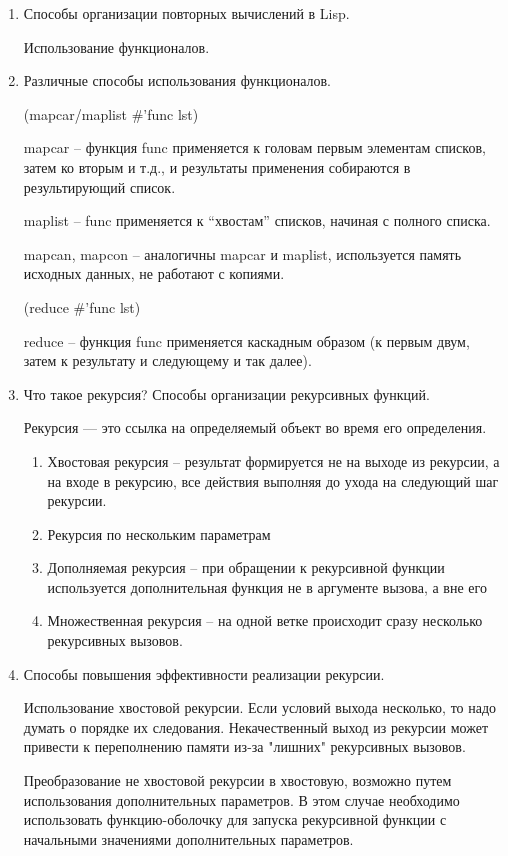 \documentclass[a4paper,14pt]{extreport} %
\begin{document}
\begin{enumerate}
\item Способы организации повторных вычислений в Lisp. 

Использование функционалов. 

\item Различные способы использования функционалов. 

(mapcar/maplist $\#$'func lst)

mapcar -- функция func применяется к головам первым элементам списков, затем ко вторым и т.д., и результаты применения собираются в результирующий список.

maplist -- func применяется к “хвостам” списков, начиная с полного списка.

mapcan, mapcon -- аналогичны mapcar и maplist, используется память исходных данных, не работают с копиями.

(reduce $\#$’func lst)

reduce -- функция func применяется каскадным образом (к первым двум, затем к результату и следующему и так далее).

\item Что такое рекурсия? Способы организации рекурсивных функций. 

Рекурсия — это ссылка на определяемый объект во время его определения. 

\begin{enumerate}
\item Хвостовая рекурсия -- результат формируется не на выходе из рекурсии, а на входе в рекурсию, все действия выполняя до ухода на следующий шаг рекурсии. 
\item Рекурсия по нескольким параметрам
\item Дополняемая рекурсия -- при обращении к рекурсивной функции используется дополнительная функция не в аргументе вызова, а вне его
\item Множественная рекурсия -- на одной ветке происходит сразу несколько рекурсивных вызовов.
\end{enumerate}

\item Способы повышения эффективности реализации рекурсии. 

Использование хвостовой рекурсии. Если условий выхода несколько, то надо думать о порядке их следования. Некачественный выход из рекурсии может привести к переполнению памяти из-за "лишних" рекурсивных вызовов. 

Преобразование не хвостовой рекурсии в хвостовую, возможно путем использования дополнительных параметров. В этом случае необходимо использовать функцию-оболочку для запуска рекурсивной функции с начальными значениями дополнительных параметров. 

\end{enumerate}
\end{document}
